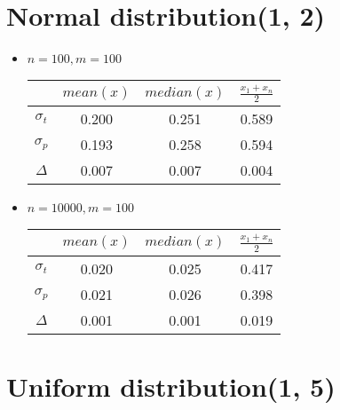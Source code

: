 \documentclass[12pt, a4paper]{article}
\begin{document}
\section{Normal distribution(1, 2)}

\begin{itemize}
    \item $n = 100, m = 100$

    \begin{tabular}{|c|c|c|c|}
        \hline & $mean(x)$ & $median(x)$ & $\frac{x_1 + x_n}{2}$ \\
        \hline $\sigma_t$ & 0.200 & 0.251 & 0.589 \\
        \hline $\sigma_p$ & 0.193 & 0.258 & 0.594 \\
        \hline $\Delta$ & 0.007 & 0.007 & 0.004 \\
        \hline
    \end{tabular}
    
    \item $n = 10000, m = 100$
    
    \begin{tabular}{|c|c|c|c|}
        \hline & $mean(x)$ & $median(x)$ & $\frac{x_1 + x_n}{2}$ \\
        \hline $\sigma_t$ & 0.020 & 0.025 & 0.417 \\
        \hline $\sigma_p$ & 0.021 & 0.026 & 0.398 \\
        \hline $\Delta$ & 0.001 & 0.001 & 0.019 \\
        \hline
    \end{tabular}
    
\end{itemize}

\newpage
\section{Uniform distribution(1, 5)}
\end{document}
